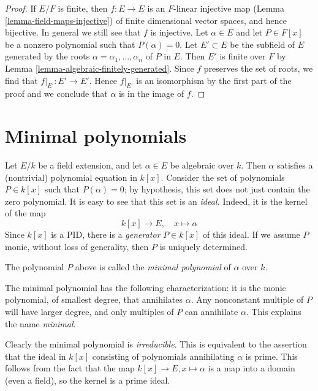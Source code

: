 \begin{proof}
If $E/F$ is finite, then $f : E \to E$ is an $F$-linear
injective map (Lemma \ref{lemma-field-maps-injective})
of finite dimensional vector spaces, and hence bijective.
In general we still see that $f$ is injective.
Let $\alpha \in E$ and let $P \in F[x]$ be a
nonzero polynomial such that $P(\alpha) = 0$.
Let $E' \subset E$ be the subfield of $E$ generated
by the roots $\alpha = \alpha_1, \ldots, \alpha_n$ of $P$ in $E$.
Then $E'$ is finite over $F$ by Lemma \ref{lemma-algebraic-finitely-generated}.
Since $f$ preserves the set of roots, we find that
$f|_{E'} : E' \to E'$. Hence $f|_{E'}$ is an isomorphism
by the first part of the proof and we conclude that $\alpha$
is in the image of $f$.
\end{proof}






\section{Minimal polynomials}
\label{section-minimal-polynomials}

\noindent
Let $E/k$ be a field extension, and let $\alpha \in E$ be algebraic over $k$.
Then $\alpha$ satisfies a (nontrivial) polynomial equation in $k[x]$.
Consider the set of polynomials $P \in k[x]$ such that $P(\alpha) = 0$; by
hypothesis, this set does not just contain the zero polynomial.
It is easy to see that this set is an {\it ideal.} Indeed, it is the kernel
of the map
$$
k[x] \to E, \quad x \mapsto \alpha
$$
Since $k[x]$ is a PID, there is a {\it generator} $P \in k[x]$ of this
ideal. If we assume $P$ monic, without loss of generality, then $P$ is
uniquely determined.

\begin{definition}
\label{definition-minimal-polynomial}
The polynomial $P$ above is called the {\it minimal polynomial}
of $\alpha$ over $k$.
\end{definition}

\noindent
The minimal polynomial has the following characterization: it is the monic
polynomial, of smallest degree, that annihilates $\alpha$. Any nonconstant
multiple of $P$ will have larger degree, and only multiples of $P$ can
annihilate $\alpha$. This explains the name {\it minimal}.

\medskip\noindent
Clearly the minimal polynomial is {\it irreducible}. This is equivalent to the
assertion that the ideal in $k[x]$ consisting of polynomials annihilating
$\alpha$ is prime. This follows from the fact that the map
$k[x] \to E, x \mapsto \alpha$ is a map into a domain (even a field), so the
kernel is a prime ideal.

